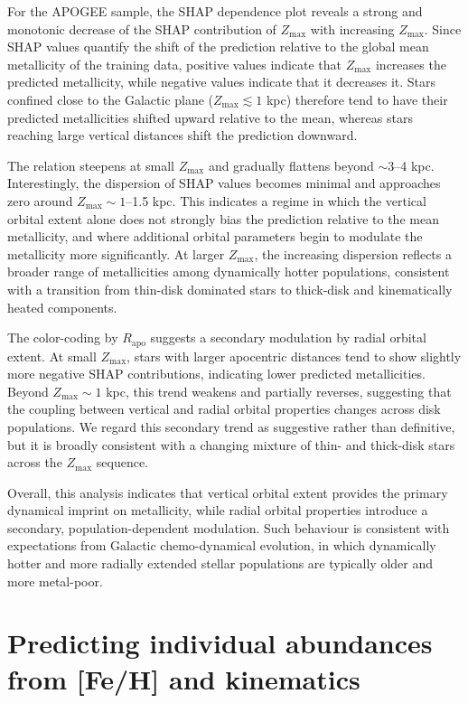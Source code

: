 \documentclass{aa}
\begin{document}
For the APOGEE sample, the SHAP dependence plot reveals a strong and monotonic decrease of the SHAP contribution of $Z_{\max}$ with increasing $Z_{\max}$. Since SHAP values quantify the shift of the prediction relative to the global mean metallicity of the training data, positive values indicate that $Z_{\max}$ increases the predicted metallicity, while negative values indicate that it decreases it. Stars confined close to the Galactic plane ($Z_{\max} \lesssim 1$ kpc) therefore tend to have their predicted metallicities shifted upward relative to the mean, whereas stars reaching large vertical distances shift the prediction downward.

The relation steepens at small $Z_{\max}$ and gradually flattens beyond $\sim$3–4 kpc. Interestingly, the dispersion of SHAP values becomes minimal and approaches zero around $Z_{\max} \sim 1$–1.5 kpc. This indicates a regime in which the vertical orbital extent alone does not strongly bias the prediction relative to the mean metallicity, and where additional orbital parameters begin to modulate the metallicity more significantly. At larger $Z_{\max}$, the increasing dispersion reflects a broader range of metallicities among dynamically hotter populations, consistent with a transition from thin-disk dominated stars to thick-disk and kinematically heated components.

The color-coding by $R_{\mathrm{apo}}$ suggests a secondary modulation by radial orbital extent. At small $Z_{\max}$, stars with larger apocentric distances tend to show slightly more negative SHAP contributions, indicating lower predicted metallicities. Beyond $Z_{\max} \sim 1$ kpc, this trend weakens and partially reverses, suggesting that the coupling between vertical and radial orbital properties changes across disk populations. We regard this secondary trend as suggestive rather than definitive, but it is broadly consistent with a changing mixture of thin- and thick-disk stars across the $Z_{\max}$ sequence.

Overall, this analysis indicates that vertical orbital extent provides the primary dynamical imprint on metallicity, while radial orbital properties introduce a secondary, population-dependent modulation. Such behaviour is consistent with expectations from Galactic chemo-dynamical evolution, in which dynamically hotter and more radially extended stellar populations are typically older and more metal-poor.


\section{Predicting individual abundances from [Fe/H] and kinematics}
\end{document}
